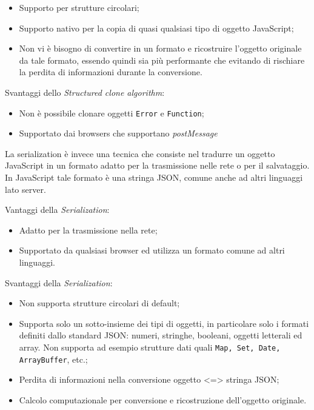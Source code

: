 \begin{itemize}
    \item Supporto per strutture circolari;
    \item Supporto nativo per la copia di quasi qualsiasi tipo di oggetto JavaScript;
    \item Non vi è bisogno di convertire in un formato e ricostruire l'oggetto originale da tale formato, essendo quindi sia più performante che evitando di rischiare la perdita di informazioni durante la conversione.
\end{itemize}

Svantaggi dello \textit{Structured clone algorithm}:

\begin{itemize}
    \item Non è possibile clonare oggetti \texttt{Error} e \texttt{Function};
    \item Supportato dai browsers che supportano \textit{postMessage}
\end{itemize}

La serialization è invece una tecnica che consiste nel tradurre un oggetto JavaScript in un formato adatto per la trasmissione nelle rete o per il salvataggio. In JavaScript tale formato è una stringa JSON, comune anche ad altri linguaggi lato server.

Vantaggi della \textit{Serialization}:

\begin{itemize}
    \item Adatto per la trasmissione nella rete;
    \item Supportato da qualsiasi browser ed utilizza un formato comune ad altri linguaggi.
\end{itemize}

Svantaggi della \textit{Serialization}:

\begin{itemize}
    \item Non supporta strutture circolari di default;
    \item Supporta solo un sotto-insieme dei tipi di oggetti, in particolare solo i formati definiti dallo standard JSON: numeri, stringhe, booleani, oggetti letterali ed array. Non supporta ad esempio strutture dati quali \texttt{Map, Set, Date, ArrayBuffer}, etc.;
    \item Perdita di informazioni nella conversione oggetto <=> stringa JSON;
    \item Calcolo computazionale per conversione e ricostruzione dell'oggetto originale.
\end{itemize}

